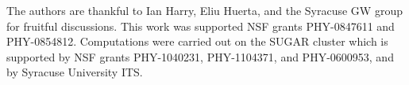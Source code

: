 \documentclass[aps,
prd,
amsmath,
amssymb,
twocolumn,
floatfix,
groupedaddress]{revtex4-1}
\begin{document}
%
%
%
\begin{acknowledgments}
The authors are thankful to Ian Harry, Eliu Huerta, and the Syracuse GW group for fruitful discussions. This work was supported NSF grants PHY-0847611 and PHY-0854812. Computations were carried out on the SUGAR cluster which is supported by NSF grants PHY-1040231, PHY-1104371, and PHY-0600953, and by Syracuse University ITS.
\end{acknowledgments}


\end{document}
